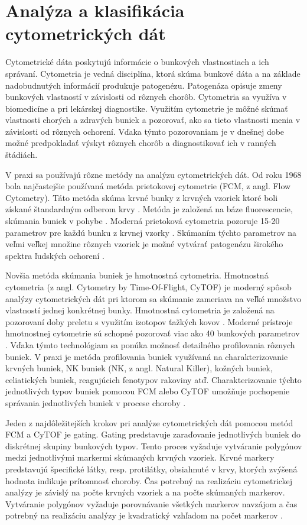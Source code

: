 \chapter{Analýza a klasifikácia cytometrických dát}
\label{DeepCyTOF_kap3}

Cytometrické dáta poskytujú informácie o bunkových vlastnostiach a ich správaní. Cytometria je vedná disciplína, ktorá skúma bunkové dáta a na základe nadobudnutých informácií produkuje patogenézu. Patogenáza opisuje zmeny bunkových vlastností v závislosti od rôznych chorôb. Cytometria sa využíva v biomedicíne a pri lekárskej diagnostike. Využitím cytometrie je môžné skúmať vlastnosti chorých a zdravých buniek a pozorovať, ako sa tieto vlastnosti menia v závislosti od rôznych ochorení. Vďaka týmto pozorovaniam je v dnešnej dobe možné predpokladať výskyt rôznych chorôb a diagnostikovať ich v ranných štádiách. 

V praxi sa používajú rôzne metódy na analýzu cytometrických dát. Od roku 1968 bola najčastejšie používaná metóda prietokovej cytometrie (FCM, z angl. Flow Cytometry). Táto metóda skúma krvné bunky z krvných vzoriek ktoré boli získané štandardným odberom krvy \cite{Li2016}. Metóda je založená na báze fluorescencie, skúmania buniek v pohybe \cite{Roubalova1934}. Moderná prietoková cytometria pozoruje 15-20 parametrov pre každú bunku z krvnej vzorky \cite{Roubalova1934}. Skúmaním týchto parametrov na veľmi veľkej množine rôznych vzoriek je možné vytvárať patogenézu širokého spektra ľudských ochorení \cite{Li2017}. 

Novšia metóda skúmania buniek je hmotnostná cytometria. Hmotnostná cytometria (z angl. Cytometry by Time-Of-Flight, CyTOF) je moderný spôsob analýzy cytometrických dát pri ktorom sa skúmanie zameriava na veľké množstvo vlastností jednej konkrétnej bunky. Hmotnostná cytometria je založená na pozorovaní doby preletu s využitím izotopov ťažkých kovov \cite{Roubalova1934}. Moderné prístroje hmotnostnej cytometrie sú schopné pozorovať viac ako 40 bunkových parametrov \cite{Roubalova1934, Li2017}. Vďaka týmto technológiam sa ponúka možnosť detailného profilovania rôznych buniek. V praxi je metóda profilovania buniek využívaná na charakterizovanie krvných buniek, NK buniek (NK, z angl. Natural Killer), kožných buniek, celiatických buniek, reagujúcich fenotypov rakoviny atď. Charakterizovanie týchto jednotlivých typov buniek pomocou FCM alebo CyTOF umožňuje pochopenie správania jednotlivých buniek v procese choroby \cite{Li2016}.

Jeden z najdôležitejších krokov pri analýze cytometrických dát pomocou metód FCM a CyTOF je gating. Gating predstavuje zaraďovanie jednotlivých buniek do diskrétnej skupiny bunkových typov. Tento proces vyžaduje vytváranie polygónov medzi jednotlivými markermi skúmaných krvných vzoriek. Krvné markery predstavujú špecifické látky, resp. protilátky, obsiahnuté v krvy, ktorých zvýšená hodnota indikuje prítomnosť choroby. Čas potrebný na realizáciu cytometrickej analýzy je závislý na počte krvných vzoriek a na počte skúmaných markerov. Vytváranie polygónov vyžaduje porovnávanie všetkých markerov navzájom a čas potrebný na realizáciu analýzy je kvadratický vzhľadom na počet markerov \cite{Li2016}. 

